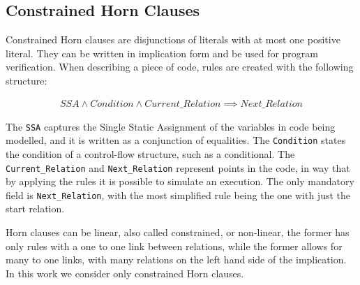 
\subsection{Constrained Horn Clauses} \label{sec:chc}

Constrained Horn clauses are disjunctions of literals with at most one positive literal. They can be written in implication form and be used for program verification. When describing a piece of code, rules are created with the following structure:

\begin{align*}
SSA \land Condition \land Current\_Relation \implies Next\_Relation
\end{align*}

The \texttt{SSA} captures the Single Static Assignment of the variables in code being modelled, and it is written as a conjunction of equalities. The \texttt{Condition} states the condition of a control-flow structure, such as a conditional. The \texttt{Current\_Relation} and \texttt{Next\_Relation} represent points in the code, in way that by applying the rules it is possible to simulate an execution. The only mandatory field is \texttt{Next\_Relation}, with the most simplified rule being the one with just the start relation.

Horn clauses can be linear, also called constrained, or non-linear, the former has only rules with a one to one link between relations, while the former allows for many to one links, with many relations on the left hand side of the implication. In this work we consider only constrained Horn clauses.

%

